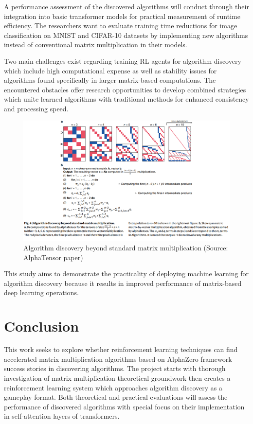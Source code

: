 \documentclass{article}
\begin{document}
A performance assessment of the discovered algorithms will conduct through their integration into basic transformer models for practical measurement of runtime efficiency. The researchers want to evaluate training time reductions for image classification on MNIST and CIFAR-10 datasets by implementing new algorithms instead of conventional matrix multiplication in their models.

Two main challenges exist regarding training RL agents for algorithm discovery which include high computational expense as well as stability issues for algorithms found specifically in larger matrix-based computations. The encountered obstacles offer research opportunities to develop combined strategies which unite learned algorithms with traditional methods for enhanced consistency and processing speed.

\begin{figure}[H]
    \centering
    \includegraphics[width=0.6\linewidth]{Picture5.png}
    \caption{Algorithm discovery beyond standard matrix multiplication (Source: AlphaTensor paper)}
    \label{fig:standard-matrix}
\end{figure}

This study aims to demonstrate the practicality of deploying machine learning for algorithm discovery because it results in improved performance of matrix-based deep learning operations.

\section{Conclusion}
This work seeks to explore whether reinforcement learning techniques can find accelerated matrix multiplication algorithms based on AlphaZero framework success stories in discovering algorithms. The project starts with thorough investigation of matrix multiplication theoretical groundwork then creates a reinforcement learning system which approaches algorithm discovery as a gameplay format. Both theoretical and practical evaluations will assess the performance of discovered algorithms with special focus on their implementation in self-attention layers of transformers.
\end{document}
